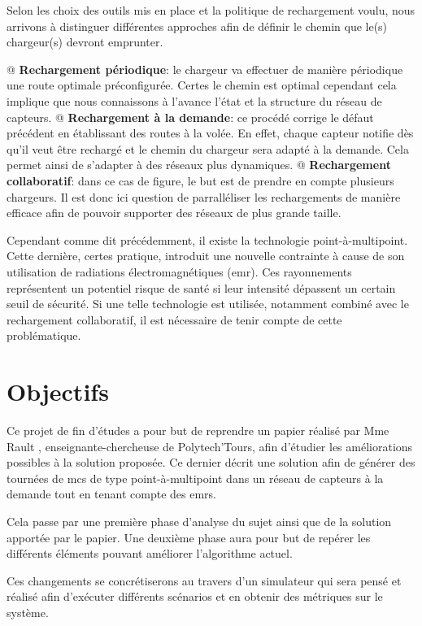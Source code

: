 \documentclass[noposter,final]{polytech/polytech}
\begin{document}
		Selon les choix des outils mis en place et la politique de rechargement voulu, nous arrivons à distinguer différentes approches afin de définir le chemin que le(s) chargeur(s) devront emprunter.
		\begin{easylist}[itemize]
			@ \textbf{Rechargement périodique}: le chargeur va effectuer de manière périodique une route optimale préconfigurée.
			Certes le chemin est optimal cependant cela implique que nous connaissons à l'avance l'état et la structure du réseau de capteurs.
			@ \textbf{Rechargement à la demande}: ce procédé corrige le défaut précédent en établissant des routes à la volée.
			En effet, chaque capteur notifie dès qu'il veut être rechargé et le chemin du chargeur sera adapté à la demande.
			Cela permet ainsi de s'adapter à des réseaux plus dynamiques.
			@ \textbf{Rechargement collaboratif}: dans ce cas de figure, le but est de prendre en compte plusieurs chargeurs.
			Il est donc ici question de parralléliser les rechargements de manière efficace afin de pouvoir supporter des réseaux de plus grande taille. 
		\end{easylist}
	
		Cependant comme dit précédemment, il existe la technologie point-à-multipoint.
		Cette dernière, certes pratique, introduit une nouvelle contrainte à cause de son utilisation de radiations électromagnétiques (\gls{emr}).
		Ces rayonnements représentent un potentiel risque de santé si leur intensité dépassent un certain seuil de sécurité.
		Si une telle technologie est utilisée, notamment combiné avec le rechargement collaboratif, il est nécessaire de tenir compte de cette problématique.
		
	\section{Objectifs}
		Ce projet de fin d'études a pour but de reprendre un papier réalisé par Mme Rault \cite{Rault:chargers}, enseignante-chercheuse de Polytech'Tours, afin d'étudier les améliorations possibles à la solution proposée.
		Ce dernier décrit une solution afin de générer des tournées de \glspl{mc} de type point-à-multipoint dans un réseau de capteurs à la demande tout en tenant compte des \glspl{emr}.
		
		Cela passe par une première phase d'analyse du sujet ainsi que de la solution apportée par le papier.
		Une deuxième phase aura pour but de repérer les différents éléments pouvant améliorer l'algorithme actuel.
		
		Ces changements se concrétiserons au travers d'un simulateur qui sera pensé et réalisé afin d'exécuter différents scénarios et en obtenir des métriques sur le système.
	
\end{document}
